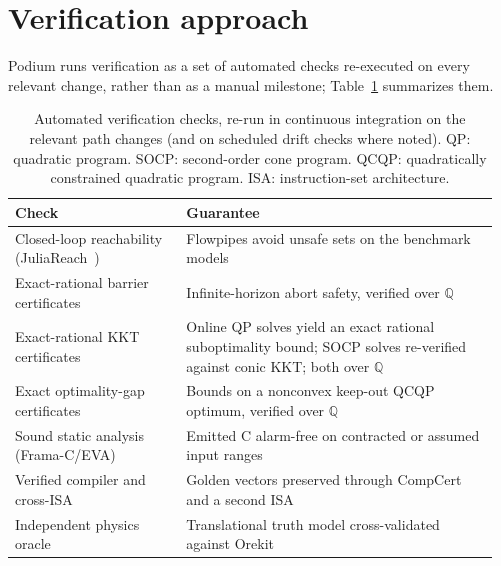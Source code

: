 \documentclass[11pt]{article}
\newcommand{\Q}{\mathbb{Q}}
\begin{document}
\section{Verification approach}

Podium runs verification as a set of automated checks re-executed on every
relevant change, rather than as a manual milestone; Table~\ref{tab:lanes}
summarizes them.

\begin{table}[tbp]
\centering
\caption{Automated verification checks, re-run in continuous integration on the
relevant path changes (and on scheduled drift checks where noted). QP: quadratic
program. SOCP: second-order cone program. QCQP: quadratically constrained
quadratic program. ISA: instruction-set architecture.}
\label{tab:lanes}
\begin{tabular}{@{}>{\raggedright\arraybackslash}p{0.34\linewidth}>{\raggedright\arraybackslash}p{0.62\linewidth}@{}}
\toprule
Check & Guarantee \\
\midrule
Closed-loop reachability (JuliaReach~\cite{juliareach2019}) & Flowpipes avoid unsafe sets on the benchmark models~\cite{archcomp2023,chan2017rendezvous} \\
Exact-rational barrier certificates & Infinite-horizon abort safety, verified over $\Q$ \\
Exact-rational KKT certificates & Online QP solves yield an exact rational suboptimality bound; SOCP solves re-verified against conic KKT; both over $\Q$ \\
Exact optimality-gap certificates & Bounds on a nonconvex keep-out QCQP optimum, verified over $\Q$ \\
Sound static analysis (Frama-C/EVA) & Emitted C alarm-free on contracted or assumed input ranges \\
Verified compiler and cross-ISA & Golden vectors preserved through CompCert and a second ISA \\
Independent physics oracle & Translational truth model cross-validated against Orekit~\cite{orekit2010} \\
\bottomrule
\end{tabular}
\end{table}
\end{document}
